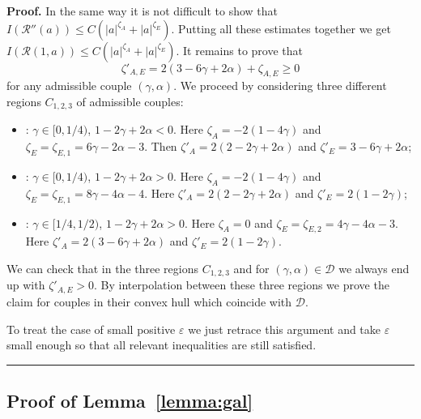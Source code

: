 \documentclass[a4paper,11pt,reqno]{article}
\newcommand{\eps}{\varepsilon}
\newcommand{\DD}{\mathcal{D}}
\newcommand{\cR}{\mathcal{R}}
\newenvironment{proof}[1][Proof]{\textbf{#1.} }{\ \rule{0.5em}{0.5em}}
\begin{document}
\begin{proof}
In the same way it is not difficult to show that $I(\cR''(a)) \le C (|a|^{\zeta_A}+ |a|^{\zeta_E})$. Putting all these estimates together we get
$
I(\cR(1,a)) \le C (|a|^{\zeta_A}+ |a|^{\zeta_E})
$. It remains to prove that
\begin{equation}
  \label{eq:cases-res}
\zeta'_{A,E} = 2(3-6\gamma+2\alpha)+\zeta_{A,E}  \ge 0  
\end{equation}
for any admissible couple $(\gamma,\alpha)$.
We proceed by considering three different regions $C_{1,2,3}$ of admissible couples:
\begin{itemize}
\item[$C_1$]: $\gamma \in [0,1/4)$, $1-2\gamma+2\alpha < 0$. Here $\zeta_A = -2(1-4\gamma)$ and $\zeta_E = \zeta_{E,1} = 6\gamma-2\alpha-3$. Then $\zeta'_A = 2(2-2\gamma+2\alpha)$ and $\zeta'_E = 3-6\gamma+2\alpha$;

\item[$C_2$]: $\gamma \in [0,1/4)$, $1-2\gamma+2\alpha > 0$. Here $\zeta_A = -2(1-4\gamma)$ and $\zeta_E= \zeta_{E,1} = 8\gamma-4\alpha-4$. Here $\zeta'_A = 2(2-2\gamma+2\alpha)$ and $\zeta'_E = 2(1-2\gamma)$;
 
\item[$C_3$]: $\gamma \in [1/4,1/2)$, $1-2\gamma+2\alpha > 0$. Here $\zeta_A = 0$ and $\zeta_E = \zeta_{E,2} =  4\gamma-4\alpha-3$. Here $\zeta'_A = 2(3-6\gamma+2\alpha)$ and $\zeta'_E = 2(1-2\gamma)$.

\end{itemize}
We can check that in the three regions $C_{1,2,3}$ and for $(\gamma,\alpha) \in \DD$ we always end up with $\zeta'_{A,E} > 0$. By interpolation between these three regions we  prove the claim for couples in their convex hull which coincide with $\DD$.

To treat the case of small positive $\eps$ we just retrace this argument and take $\eps$ small enough so that all relevant inequalities are still satisfied. 
\end{proof}



\subsection{Proof of Lemma~\ref{lemma:gal}}
\end{document}
